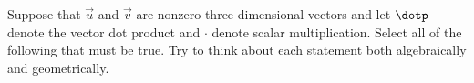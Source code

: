 \documentclass{ximera}
\author{Jim Talamo}
\begin{document}
\begin{exercise}
Suppose that $\vec{u}$ and $\vec{v}$ are nonzero three dimensional vectors and let $\dotp$ denote the vector dot product and $\cdot$ denote scalar multiplication.  Select all of the following that must be true.  Try to think about each statement both algebraically and geometrically.

\begin{selectAll}

\end{selectAll}
\end{exercise}
\end{document}
